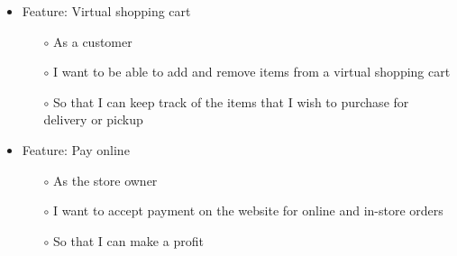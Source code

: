 \documentclass{scrreprt}
\theoremstyle{funreq}
\begin{document}
	\begin{itemize}
		\item Feature: Virtual shopping cart
		\begin{itemize}
			\item[$\circ$]As a customer
			\item[$\circ$]I want to be able to add and remove items from a virtual shopping cart
			\item[$\circ$]So that I can keep track of the items that I wish to purchase for delivery or pickup
		\end{itemize}
	\end{itemize}
	
	\begin{itemize}
		\item Feature: Pay online
		\begin{itemize}
			\item[$\circ$]As the store owner
			\item[$\circ$]I want to accept payment on the website for online and in-store orders
			\item[$\circ$]So that I can make a profit
		\end{itemize}
	\end{itemize}
	
	
\end{document}
